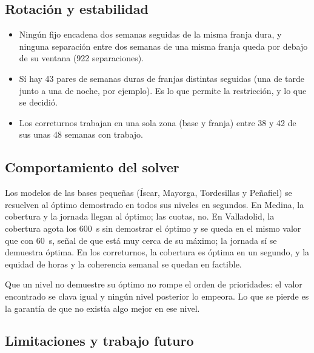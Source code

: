\documentclass[11pt,a4paper]{article}
\begin{document}
\subsection{Rotación y estabilidad}

\begin{itemize}[nosep]
  \item Ningún fijo encadena dos semanas seguidas de la misma franja dura, y ninguna separación
        entre dos semanas de una misma franja queda por debajo de su ventana (922 separaciones).
  \item Sí hay 43 pares de semanas duras de franjas distintas seguidas (una de tarde junto a
        una de noche, por ejemplo). Es lo que permite la restricción, y lo que se decidió.
  \item Los correturnos trabajan en una sola zona (base y franja) entre 38 y 42 de sus unas 48
        semanas con trabajo.
\end{itemize}

\subsection{Comportamiento del solver}

Los modelos de las bases pequeñas (Íscar, Mayorga, Tordesillas y Peñafiel) se resuelven al
óptimo demostrado en todos sus niveles en segundos. En Medina, la cobertura y la jornada llegan
al óptimo; las cuotas, no. En Valladolid, la cobertura agota los 600~s sin demostrar el óptimo
y se queda en el mismo valor que con 60~s, señal de que está muy cerca de su máximo; la jornada
sí se demuestra óptima. En los correturnos, la cobertura es óptima en un segundo, y la
equidad de horas y la coherencia semanal se quedan en factible.

Que un nivel no demuestre su óptimo no rompe el orden de prioridades: el valor encontrado se
clava igual y ningún nivel posterior lo empeora. Lo que se pierde es la garantía de que no
existía algo mejor en ese nivel.

\subsection{Limitaciones y trabajo futuro}
\end{document}
